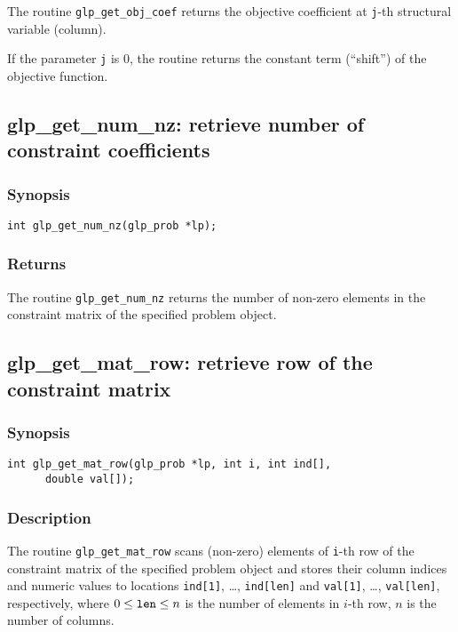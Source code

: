 The routine \verb|glp_get_obj_coef| returns the objective coefficient
at \verb|j|-th structural variable (column).

If the parameter \verb|j| is 0, the routine returns the constant term
(``shift'') of the objective function.

\subsection{glp\_get\_num\_nz: retrieve number of constraint
coefficients}

\subsubsection*{Synopsis}

\begin{verbatim}
int glp_get_num_nz(glp_prob *lp);
\end{verbatim}

\subsubsection*{Returns}

The routine \verb|glp_get_num_nz| returns the number of non-zero
elements in the constraint matrix of the specified problem object.

\subsection{glp\_get\_mat\_row: retrieve row of the constraint
matrix}

\subsubsection*{Synopsis}

\begin{verbatim}
int glp_get_mat_row(glp_prob *lp, int i, int ind[],
      double val[]);
\end{verbatim}

\subsubsection*{Description}

The routine \verb|glp_get_mat_row| scans (non-zero) elements of
\verb|i|-th row of the constraint matrix of the specified problem object
and stores their column indices and numeric values to locations
\verb|ind[1]|, \dots, \verb|ind[len]| and \verb|val[1]|, \dots,
\verb|val[len]|, respectively, where $0\leq{\tt len}\leq n$ is the
number of elements in $i$-th row, $n$ is the number of columns.

